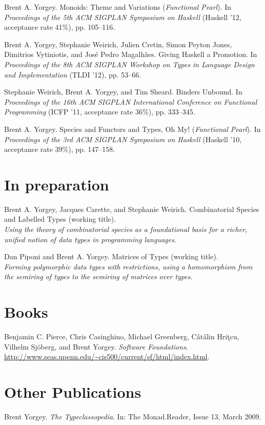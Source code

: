 \documentclass{article}
\newcommand{\cvitem}{\par\hangpara{2em}{1}}
\begin{document}
\cvitem Brent A. Yorgey. Monoids: Theme and Variations
(\emph{Functional Pearl}).  In \emph{Proceedings of the 5th ACM
  SIGPLAN Symposium on Haskell} (Haskell '12, acceptance rate 41\%),
pp. 105--116.

\cvitem Brent A. Yorgey, Stephanie Weirich, Julien Cretin, Simon
Peyton Jones, Dimitrios Vytiniotis, and Jos\'e Pedro
Magalh\~aes. Giving Haskell a Promotion. In \emph{Proceedings of the
  8th ACM SIGPLAN Workshop on Types in Language Design and
  Implementation} (TLDI '12), pp. 53--66.

\cvitem Stephanie Weirich, Brent A. Yorgey, and Tim Sheard. Binders
Unbound. In \emph{Proceedings of the 16th ACM SIGPLAN International
  Conference on Functional Programming} (ICFP '11, acceptance rate
  36\%), pp. 333--345.

\cvitem Brent A. Yorgey. Species and Functors and Types, Oh
  My! (\emph{Functional Pearl}). In \emph{Proceedings of the 3rd ACM SIGPLAN
  Symposium on Haskell} (Haskell '10, acceptance rate 39\%), pp. 147--158.

\section*{In preparation}

\cvitem Brent A. Yorgey, Jacques Carette, and Stephanie Weirich.
Combinatorial Species and Labelled Types (working title). \\
\emph{Using the theory of combinatorial species as a foundational
  basis for a richer, unified notion of data types in programming
  languages.}

\cvitem Dan Piponi and Brent A. Yorgey. Matrices of Types (working
title). \\
\emph{Forming polymorphic data types with restrictions, using a
  homomorphism from the semiring of types to the semiring of matrices
  over types.}

\section*{Books}
\cvitem Benjamin C. Pierce, Chris Casinghino, Michael Greenberg,
C{\v a}t{\v a}lin Hri{\c t}cu, Vilhelm Sj\"oberg, and Brent Yorgey. \emph{Software
  Foundations}. \url{http://www.seas.upenn.edu/~cis500/current/sf/html/index.html}.

\section*{Other Publications}
\cvitem Brent Yorgey. \emph{The Typeclassopedia}. In: The
Monad.Reader, Issue 13, March 2009.
\end{document}
